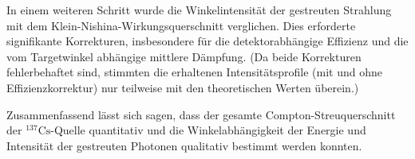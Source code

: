 In einem weiteren Schritt wurde die Winkelintensität der gestreuten Strahlung mit dem Klein-Nishina-Wirkungsquerschnitt verglichen. Dies erforderte signifikante Korrekturen, insbesondere für die detektorabhängige Effizienz und die vom Targetwinkel abhängige mittlere Dämpfung. 
(Da beide Korrekturen fehlerbehaftet sind, stimmten die erhaltenen Intensitätsprofile (mit und ohne Effizienzkorrektur) nur teilweise mit den theoretischen Werten überein.)

Zusammenfassend lässt sich sagen, dass der gesamte Compton-Streuquerschnitt der $^{137}\text{Cs}$-Quelle quantitativ und die Winkelabhängigkeit der Energie und Intensität der gestreuten Photonen qualitativ bestimmt werden konnten.